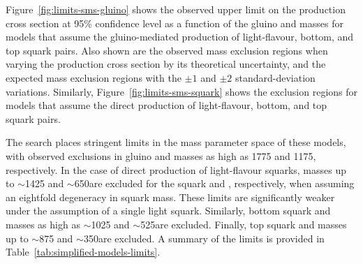 Figure~\ref{fig:limits-sms-gluino} shows the observed upper limit on
the production cross section at 95\% confidence level as a function of
the gluino and \chiz masses for models that assume the gluino-mediated
production of light-flavour, bottom, and top squark pairs. Also shown
are the observed mass exclusion regions when varying the production
cross section by its theoretical uncertainty, and the expected mass
exclusion regions with the ${\pm}1$ and ${\pm}2$ standard-deviation
variations. Similarly, Figure~\ref{fig:limits-sms-squark} shows the
exclusion regions for models that assume the direct production of
light-flavour, bottom, and top squark pairs.

The search places stringent limits in the mass parameter space of
these models, with observed exclusions in gluino and \chiz masses as
high as 1775 and 1175\GeV, respectively. In the case of direct
production of light-flavour squarks, masses up to $\sim$1425 and
$\sim$650\GeV are excluded for the squark and \chiz, respectively,
when assuming an eightfold degeneracy in squark mass. These limits are
significantly weaker under the assumption of a single light
squark. Similarly, bottom squark and \chiz masses as high as
$\sim$1025 and $\sim$525\GeV are excluded. Finally, top squark and
\chiz masses up to $\sim$875 and $\sim$350\GeV are excluded. A summary
of the limits is provided in Table~\ref{tab:simplified-models-limits}.

